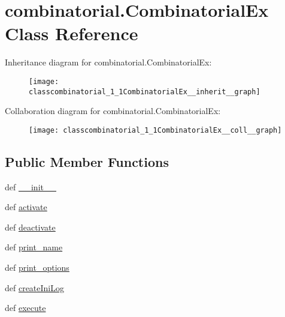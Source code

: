 \hypertarget{classcombinatorial_1_1CombinatorialEx}{\section{combinatorial.\-Combinatorial\-Ex Class Reference}
\label{classcombinatorial_1_1CombinatorialEx}
}


Inheritance diagram for combinatorial.\-Combinatorial\-Ex\-:\nopagebreak
\begin{figure}[H]
\begin{center}
\leavevmode
\texttt{[image: classcombinatorial\_1\_1CombinatorialEx\_\_inherit\_\_graph]}
\end{center}
\end{figure}


Collaboration diagram for combinatorial.\-Combinatorial\-Ex\-:\nopagebreak
\begin{figure}[H]
\begin{center}
\leavevmode
\texttt{[image: classcombinatorial\_1\_1CombinatorialEx\_\_coll\_\_graph]}
\end{center}
\end{figure}
\subsection*{Public Member Functions}
\begin{DoxyCompactItemize}
\item 
def \hyperlink{classcombinatorial_1_1CombinatorialEx_a9a4fbfcf64b1204c14509d348dd23b5d}{\-\_\-\-\_\-init\-\_\-\-\_\-}
\item 
def \hyperlink{classcombinatorial_1_1CombinatorialEx_a8d0b7c0da355183d8124871bee76b0bd}{activate}
\item 
def \hyperlink{classcombinatorial_1_1CombinatorialEx_ad53efcff93773cce7ed9cfc2fef38ab3}{deactivate}
\item 
def \hyperlink{classcombinatorial_1_1CombinatorialEx_a19f6321bf42ab92280c5e3b0a3af89d0}{print\-\_\-name}
\item 
def \hyperlink{classcombinatorial_1_1CombinatorialEx_ae802ad33a050ada42292e7c80fb3e486}{print\-\_\-options}
\item 
def \hyperlink{classcombinatorial_1_1CombinatorialEx_ac0216f0d0041c35a91e01ac9dafd49da}{create\-Ini\-Log}
\item 
def \hyperlink{classcombinatorial_1_1CombinatorialEx_a5a5fbd1692c100374ee458e4babc9832}{execute}
\end{DoxyCompactItemize}
